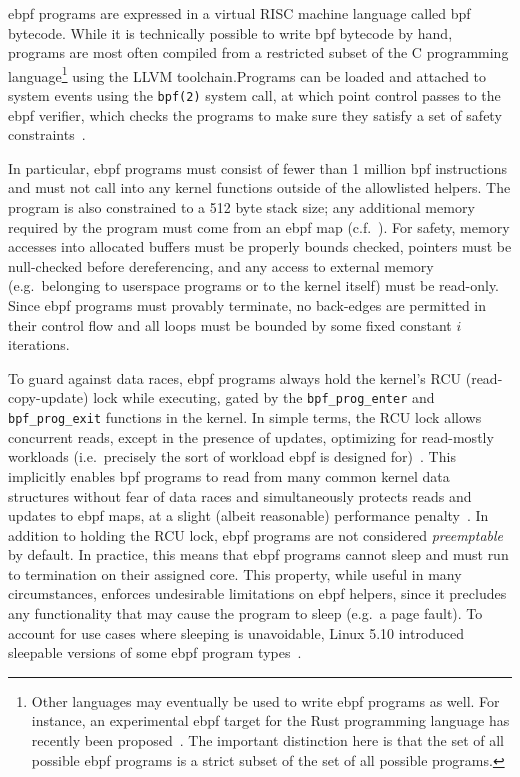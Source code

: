 \gls{ebpf} programs are expressed in a virtual RISC machine language called \gls{bpf} bytecode.  While
it is technically possible to write \gls{bpf} bytecode by hand, programs are most often compiled
from a restricted subset of the C programming language\footnote{Other languages may
eventually be used to write \gls{ebpf} programs as well.  For instance, an experimental \gls{ebpf}
target for the Rust programming language has recently been
proposed~\cite{decina2021_bpf_rust}. The important distinction here is that the set of all
possible \gls{ebpf} programs is a strict subset of the set of all possible programs.} using the
LLVM toolchain.Programs can be loaded and attached to system events using the
\texttt{bpf(2)} system call, at which point control passes to the \gls{ebpf} verifier, which
checks the programs to make sure they satisfy a set of safety
constraints~\cite{starovoitov2014_ebpf, gregg2019_bpf}.

In particular, \gls{ebpf} programs must consist of fewer than 1 million \gls{bpf}
instructions and must not call into any kernel functions outside of the allowlisted
helpers. The program is also constrained to a 512 byte stack size; any additional memory
required by the program must come from an \gls{ebpf} map (c.f.~). For
safety, memory accesses into allocated buffers must be properly bounds checked, pointers
must be null-checked before dereferencing, and any access to external memory
(e.g.~belonging to userspace programs or to the kernel itself) must be read-only. Since
\gls{ebpf} programs must provably terminate, no back-edges are permitted in their control
flow and all loops must be bounded by some fixed constant $i$ iterations.

To guard against data races, \gls{ebpf} programs always hold the kernel's RCU (read-copy-update)
lock while executing, gated by the \texttt{bpf\_prog\_enter} and \texttt{bpf\_prog\_exit}
functions in the kernel. In simple terms, the RCU lock allows concurrent reads, except in
the presence of updates, optimizing for read-mostly workloads (i.e.~precisely the sort of
workload \gls{ebpf} is designed for)~\cite{mckenney2007_rcu}. This implicitly enables \gls{bpf}
programs to read from many common kernel data structures without fear of data races and
simultaneously protects reads and updates to \gls{ebpf} maps, at a slight (albeit reasonable)
performance penalty~\cite{mckenney2007_rcu}. In addition to holding the RCU lock, \gls{ebpf}
programs are not considered \textit{preemptable} by default. In practice, this means that
\gls{ebpf} programs cannot sleep and must run to termination on their assigned core. This
property, while useful in many circumstances, enforces undesirable limitations on \gls{ebpf}
helpers, since it precludes any functionality that may cause the program to sleep (e.g.~a
page fault). To account for use cases where sleeping is unavoidable, Linux 5.10 introduced
sleepable versions of some \gls{ebpf} program types~\cite{starovoitov2020_sleepable}.

